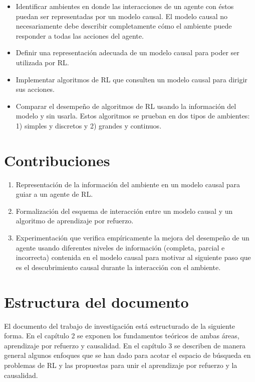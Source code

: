 \begin{itemize}
    \item Identificar ambientes en donde 
    las interacciones de un agente con éstos puedan ser representadas por un modelo causal.
    El modelo causal no necesariamente debe
    describir completamente cómo el ambiente puede responder a todas las acciones del agente.
    \item Definir una representación adecuada
    de un modelo causal para poder ser utilizada 
    por RL.
    \item Implementar algoritmos de RL que consulten un modelo causal para dirigir sus acciones.
    \item Comparar el desempeño de algoritmos
    de RL usando la información del modelo y 
    sin usarla. Estos algoritmos se prueban en
    dos tipos de ambientes: 1) simples y discretos y 2) grandes y continuos.
\end{itemize}


\section{Contribuciones}


\begin{enumerate}
    \item Representación de la información del ambiente
    en un modelo causal para guiar a un agente de RL.
    \item 
    Formalización del esquema 
    de interacción entre
    un modelo causal y un algoritmo de aprendizaje por
    refuerzo.
    \item Experimentación que verifica empíricamente
    la mejora del desempeño de un agente usando diferentes niveles de información (completa, parcial e incorrecta) contenida en el modelo causal para motivar al siguiente paso 
    que es el descubrimiento causal durante la interacción con el
    ambiente.
\end{enumerate}

\section{Estructura del documento}

El documento del trabajo de investigación está estructurado de la 
siguiente forma.
En el capítulo 2 se exponen los fundamentos teóricos de ambas áreas, aprendizaje por refuerzo y causalidad.
En el capítulo 3 se describen de manera general algunos enfoques
que se han dado para acotar el espacio de búsqueda en problemas
de RL y las propuestas para unir el aprendizaje por refuerzo y
la causalidad.
